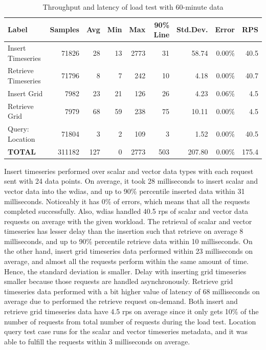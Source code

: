 \begin{table}[ht]
\caption{Throughput and latency of load test with 60-minute data}
\footnotesize
\begin{tabulary}{\linewidth}{|L|R|R|R|R|R|R|R|R|}
\hline
\textbf{Label} & \textbf{Samples} & \textbf{Avg} & \textbf{Min} & \textbf{Max} & \textbf{90\% Line} & \textbf{Std.Dev.} & \textbf{Error} & \textbf{RPS} \\ \hline
Insert Timeseries & 71826 & 28 & 13 & 2773 & 31 & 58.74 & 0.00\% & 40.5 \\ \hline
Retrieve Timeseries & 71796 & 8 & 7 & 242 & 10 & 4.18 & 0.00\% & 40.7 \\ \hline
Insert Grid & 7982 & 23 & 21 & 126 & 26 & 4.23 & 0.06\% & 4.5 \\ \hline
Retrieve Grid & 7979 & 68 & 59 & 238 & 75 & 10.11 & 0.00\% & 4.5 \\ \hline
Query: Location & 71804 & 3 & 2 & 109 & 3 & 1.52 & 0.00\% & 40.5 \\ \hline
\textbf{TOTAL} & 311182 & 127 & 0 & 2773 & 503 & 207.80 & 0.00\% & 175.4 \\ \hline
\end{tabulary}
\label{tab:obs_all_60_min_summary}
\end{table}
Insert timeseries performed over scalar and vector data types with each request sent with 24 data points. On average, it took 28 milliseconds to insert scalar and vector data into the \acrshort{wdias}, and up to 90\% percentile inserted data within 31 milliseconds. Noticeably it has 0\% of errors, which means that all the requests completed successfully. Also, \acrshort{wdias} handled 40.5 \acrshort{rps} of scalar and vector data requests on average with the given workload. The retrieval of scalar and vector timeseries has lesser delay than the insertion such that retrieve on average 8 milliseconds, and up to 90\% percentile retrieve data within 10 milliseconds.
On the other hand, insert grid timeseries data performed within 23 milliseconds on average, and almost all the requests perform within the same amount of time. Hence, the standard deviation is smaller. Delay with inserting grid timeseries smaller because those requests are handled asynchronously. Retrieve grid timeseries data performed with a bit higher value of latency of 68 milliseconds on average due to performed the retrieve request on-demand. Both insert and retrieve grid timeseries data have 4.5 \acrshort{rps} on average since it only gets 10\% of the number of requests from total number of requests during the load test. Location query test case runs for the scalar and vector timeseries metadata, and it was able to fulfill the requests within 3 milliseconds on average.

